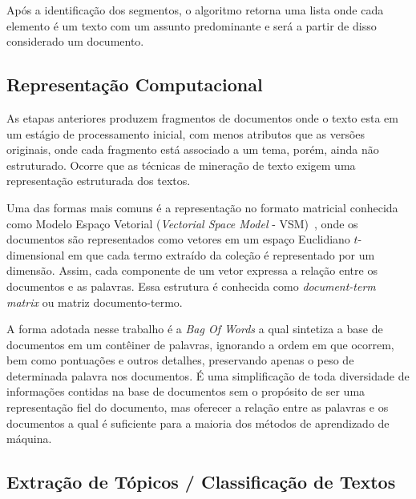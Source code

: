 Após a identificação dos segmentos, o algoritmo retorna uma lista onde cada elemento é um texto com um assunto predominante e será a partir de disso considerado um documento.







\subsection{Representação Computacional}

As etapas anteriores produzem fragmentos de documentos onde o texto esta em um estágio de processamento inicial, com menos atributos que as versões originais, onde cada fragmento está associado a um tema, porém, ainda não estruturado. Ocorre que as técnicas de mineração de texto exigem uma representação estruturada dos textos. %

Uma das formas mais comuns é a representação no formato matricial conhecida como Modelo Espaço Vetorial (\textit{Vectorial Space Model} - VSM)~\cite{Rezende2003}, onde os documentos são representados como vetores em um espaço Euclidiano $t$-dimensional em que cada termo extraído da coleção é representado por um dimensão. Assim, cada componente de um vetor expressa a relação entre os documentos e as palavras. Essa estrutura é conhecida como \textit{document-term matrix} ou matriz documento-termo.

A forma adotada nesse trabalho é a \textit{Bag Of Words} a qual sintetiza a base de documentos em um contêiner de palavras, ignorando a ordem em que ocorrem, bem como pontuações e outros detalhes, preservando apenas o peso de determinada palavra nos documentos. É uma simplificação de toda diversidade de informações contidas na base de documentos sem o propósito de ser uma representação fiel do documento, mas oferecer a relação entre as palavras e os documentos a qual é suficiente para a maioria dos métodos de aprendizado de máquina.%






\subsection{Extração de Tópicos / Classificação de Textos}

